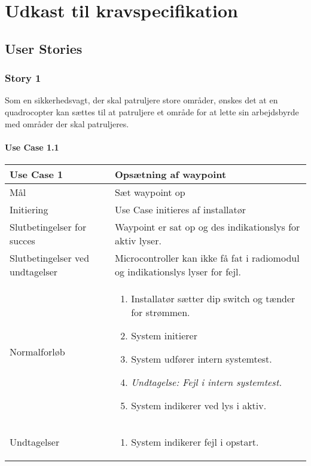 \documentclass[Main]{subfiles}
\begin{document}
\chapter{Udkast til kravspecifikation}


\section{User Stories}

\subsection{Story 1}
Som en sikkerhedsvagt, der skal patruljere store områder, ønskes det at en quadrocopter kan sættes til at patruljere et område for at lette sin arbejdsbyrde med områder der skal patruljeres.


\subsubsection{Use Case 1.1}

\begin{longtable}{|p{}|p{}|}
\hline
Use Case 1 	& Opsætning af waypoint \\ \hline

Mål 		& Sæt waypoint op \\ \hline

Initiering	& Use Case initieres af installatør \\ \hline

Slutbetingelser for succes & Waypoint er sat op og des indikationslys for aktiv lyser.  \\ \hline

Slutbetingelser ved undtagel\-ser & 
Microcontroller kan ikke få fat i radiomodul og indikationslys lyser for fejl. \\ \hline

Normalforløb &	\vspace{-8mm}
	\begin{enumerate}
	\item Installatør sætter dip switch og tænder for strømmen.
	\item System initierer
	\item System udfører intern systemtest.
	\item[]	\textit{Undtagelse: Fejl i intern systemtest.}
	\item System indikerer ved lys i aktiv.
	\end{enumerate} \\ \hline

Undtagelser & \vspace{-8mm}
	\begin{enumerate}
	\item System indikerer fejl i opstart.
	\end{enumerate} \\

\hline
\end{longtable}
\end{document}

